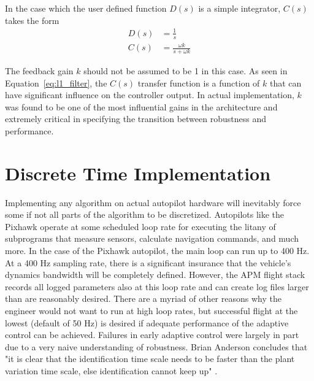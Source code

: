 In the case which the user defined function $D(s)$ is a simple integrator, $C(s)$ takes the form
\begin{equation}\label{eq:l1_filter}
\begin{split}
D(s)&=\frac{1}{s}\\
C(s)&=\frac{\omega k}{s+\omega k}
\end{split}
\end{equation}

The feedback gain $k$ should not be assumed to be 1 in this case.  As seen in Equation~\ref{eq:l1_filter}, the $C(s)$ transfer function is a function of $k$ that can have significant influence on the controller output.  In actual implementation, $k$ was found to be one of the most influential gains in the architecture and extremely critical in specifying the transition between robustness and performance.


\section{\Lone Discrete Time Implementation}\label{sec:discrete_time_implementation}
Implementing any algorithm on actual autopilot hardware will inevitably force some if not all parts of the algorithm to be discretized.  Autopilots like the Pixhawk operate at some scheduled loop rate for executing the litany of subprograms that measure sensors, calculate navigation commands, and much more.  In the case of the Pixhawk autopilot, the main loop can run up to 400 Hz.  At a 400 Hz sampling rate, there is a significant insurance that the vehicle's dynamics bandwidth will be completely defined.  However, the \ac{APM} flight stack records all logged parameters also at this loop rate and can create log files larger than are reasonably desired.  There are a myriad of other reasons why the engineer would not want to run at high loop rates, but successful flight at the lowest (default of 50 Hz) is desired if adequate performance of the adaptive control can be achieved.  Failures in early adaptive control were largely in part due to a very naive understanding of robustness.  Brian Anderson concludes that "it is clear that the identification time scale needs to be faster than the plant variation time scale, else identification cannot keep up" \cite{anderson2005failures}.  

